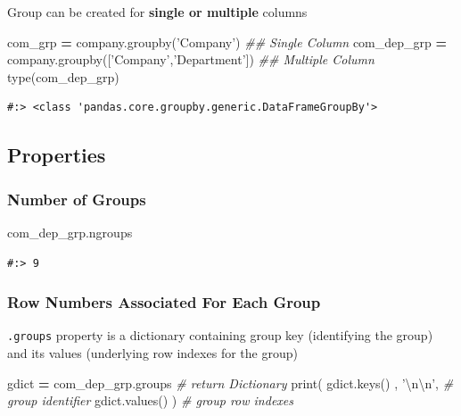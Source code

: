 \documentclass[
]{book}
\newenvironment{Shaded}{\begin{snugshade}}{\end{snugshade}}
\newcommand{\BuiltInTok}[1]{#1}
\newcommand{\CharTok}[1]{\textcolor[rgb]{0.5,0.5,0.5}{#1}}
\newcommand{\CommentTok}[1]{\textcolor[rgb]{0.37,0.37,0.37}{\textit{#1}}}
\newcommand{\NormalTok}[1]{#1}
\newcommand{\OperatorTok}[1]{\textcolor[rgb]{0.43,0.43,0.43}{\textbf{#1}}}
\newcommand{\StringTok}[1]{\textcolor[rgb]{0.5,0.5,0.5}{#1}}
\begin{document}
Group can be created for \textbf{single or multiple} columns

\begin{Shaded}
\begin{Highlighting}[]
\NormalTok{com_grp }\OperatorTok{=}\NormalTok{ company.groupby(}\StringTok{'Company'}\NormalTok{) }\CommentTok{## Single Column}
\NormalTok{com_dep_grp }\OperatorTok{=}\NormalTok{ company.groupby([}\StringTok{'Company'}\NormalTok{,}\StringTok{'Department'}\NormalTok{])  }\CommentTok{## Multiple Column}
\BuiltInTok{type}\NormalTok{(com_dep_grp)}
\end{Highlighting}
\end{Shaded}

\begin{verbatim}
#:> <class 'pandas.core.groupby.generic.DataFrameGroupBy'>
\end{verbatim}

\hypertarget{properties-1}{%
\subsection{Properties}\label{properties-1}}

\hypertarget{number-of-groups}{%
\subsubsection{Number of Groups}\label{number-of-groups}}

\begin{Shaded}
\begin{Highlighting}[]
\NormalTok{com_dep_grp.ngroups}
\end{Highlighting}
\end{Shaded}

\begin{verbatim}
#:> 9
\end{verbatim}

\hypertarget{row-numbers-associated-for-each-group}{%
\subsubsection{Row Numbers Associated For Each Group}\label{row-numbers-associated-for-each-group}}

\texttt{.groups} property is a dictionary containing group key (identifying the group) and its values (underlying row indexes for the group)

\begin{Shaded}
\begin{Highlighting}[]
\NormalTok{gdict }\OperatorTok{=}\NormalTok{ com_dep_grp.groups       }\CommentTok{# return Dictionary}
\BuiltInTok{print}\NormalTok{( gdict.keys()   , }\StringTok{'}\CharTok{\textbackslash{}n\textbackslash{}n}\StringTok{'}\NormalTok{,  }\CommentTok{# group identifier}
\NormalTok{       gdict.values()   )        }\CommentTok{# group row indexes}
\end{Highlighting}
\end{Shaded}
\end{document}
